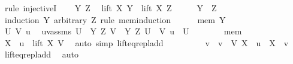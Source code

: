 \begin{isabellebody}
%
\isadelimproof
%
\endisadelimproof
%
\isatagproof
{}\isamarkupfalse%
\ {\isacharparenleft}{\kern0pt}rule\ injectiveI{\isacharparenright}{\kern0pt}\isanewline
\ \ \isamarkupfalse%
\ Y\ Z\ \isamarkupfalse%
\ {\isachardoublequoteopen}lift\ X\ Y\ {\isacharequal}{\kern0pt}\ lift\ X\ Z{\isachardoublequoteclose}\isanewline
\ \ \isamarkupfalse%
\ \isamarkupfalse%
\ {\isachardoublequoteopen}Y\ {\isacharequal}{\kern0pt}\ Z{\isachardoublequoteclose}\isanewline
\ \ \isamarkupfalse%
\ {\isacharparenleft}{\kern0pt}induction\ Y\ arbitrary{\isacharcolon}{\kern0pt}\ Z\ rule{\isacharcolon}{\kern0pt}\ mem{\isacharunderscore}{\kern0pt}induction{\isacharparenright}{\kern0pt}\isanewline
\ \ \ \ \isamarkupfalse%
\ {\isacharparenleft}{\kern0pt}mem\ Y{\isacharparenright}{\kern0pt}\isanewline
\ \ \ \ \isacommand{{\isacharbraceleft}{\kern0pt}}\isamarkupfalse%
\isanewline
\ \ \ \ \ \ \isamarkupfalse%
\ U\ V\ u\ \isamarkupfalse%
\ uvassms{\isacharcolon}{\kern0pt}\ {\isachardoublequoteopen}U\ {\isasymin}\ {\isacharbraceleft}{\kern0pt}Y{\isacharcomma}{\kern0pt}\ Z{\isacharbraceright}{\kern0pt}{\isachardoublequoteclose}\ {\isachardoublequoteopen}V\ {\isasymin}\ {\isacharbraceleft}{\kern0pt}Y{\isacharcomma}{\kern0pt}\ Z{\isacharbraceright}{\kern0pt}{\isachardoublequoteclose}\ {\isachardoublequoteopen}U\ {\isasymnoteq}\ V{\isachardoublequoteclose}\ {\isachardoublequoteopen}u\ {\isasymin}\ U{\isachardoublequoteclose}\isanewline
\ \ \ \ \ \ \isamarkupfalse%
\ mem\ \isamarkupfalse%
\ {\isachardoublequoteopen}X\ {\isacharplus}{\kern0pt}\ u\ {\isasymin}\ lift\ X\ V{\isachardoublequoteclose}\ \isamarkupfalse%
\ {\isacharparenleft}{\kern0pt}auto\ simp{\isacharcolon}{\kern0pt}\ lift{\isacharunderscore}{\kern0pt}eq{\isacharunderscore}{\kern0pt}repl{\isacharunderscore}{\kern0pt}add{\isacharparenright}{\kern0pt}\isanewline
\ \ \ \ \ \ \isamarkupfalse%
\ \isamarkupfalse%
\ v\ \ {\isachardoublequoteopen}v\ {\isasymin}\ V{\isachardoublequoteclose}\ {\isachardoublequoteopen}X\ {\isacharplus}{\kern0pt}\ u\ {\isacharequal}{\kern0pt}\ X\ {\isacharplus}{\kern0pt}\ v{\isachardoublequoteclose}\ \isamarkupfalse%
\ lift{\isacharunderscore}{\kern0pt}eq{\isacharunderscore}{\kern0pt}repl{\isacharunderscore}{\kern0pt}add\ \isamarkupfalse%
\ auto\isanewline
\ \ \ \ \ \ \isamarkupfalse%
\ \isamarkupfalse%

\end{isabellebody}
